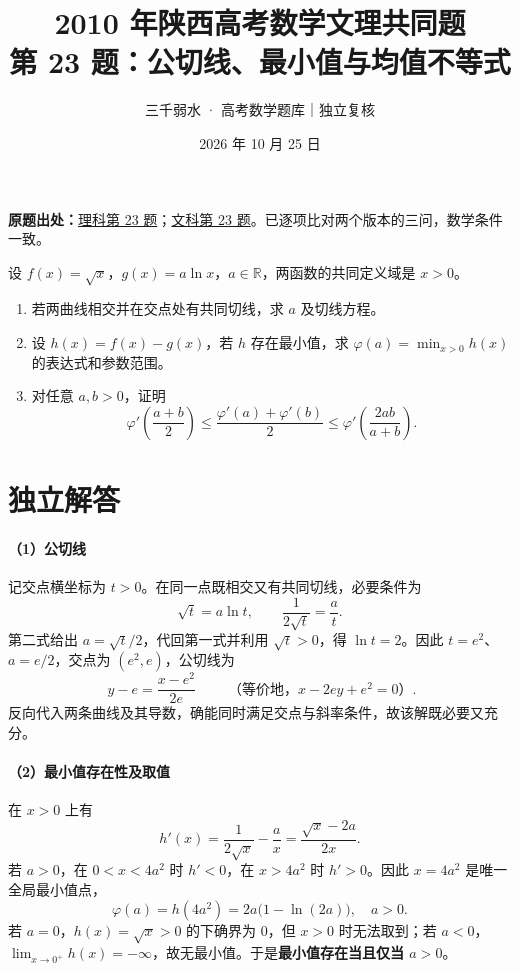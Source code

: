 \documentclass[UTF8,a4paper,10pt]{ctexart}
\title{2010 年陕西高考数学文理共同题\\[2pt]\large 第 23 题：公切线、最小值与均值不等式}
\author{三千弱水 · 高考数学题库｜独立复核}
\date{2026 年 10 月 25 日}
\begin{document}
\maketitle
\noindent\textbf{原题出处：}\href{https://github.com/DxAThing/Gaokao-Math-Problems-Compilation/blob/f1ae169b58a75b3db6e35c670b3f0d5c78718188/content/2010/shaanxi_science.tex\#L500}{理科第 23 题}；\href{https://github.com/DxAThing/Gaokao-Math-Problems-Compilation/blob/f1ae169b58a75b3db6e35c670b3f0d5c78718188/content/2010/shaanxi_liberal.tex\#L509}{文科第 23 题}。已逐项比对两个版本的三问，数学条件一致。

设 $f(x)=\sqrt{x}$，$g(x)=a\ln x$，$a\in\mathbb R$，两函数的共同定义域是 $x>0$。
\begin{enumerate}
\item 若两曲线相交并在交点处有共同切线，求 $a$ 及切线方程。
\item 设 $h(x)=f(x)-g(x)$，若 $h$ 存在最小值，求 $\varphi(a)=\min_{x>0}h(x)$ 的表达式和参数范围。
\item 对任意 $a,b>0$，证明
\[
\varphi'\!\left(\frac{a+b}{2}\right)
\leq\frac{\varphi'(a)+\varphi'(b)}{2}
\leq\varphi'\!\left(\frac{2ab}{a+b}\right).
\]
\end{enumerate}

\section*{独立解答}
\paragraph{（1）公切线}
记交点横坐标为 $t>0$。在同一点既相交又有共同切线，必要条件为
\[
\sqrt t=a\ln t,\qquad \frac{1}{2\sqrt t}=\frac{a}{t}.
\]
第二式给出 $a=\sqrt t/2$，代回第一式并利用 $\sqrt t>0$，得 $\ln t=2$。因此 $t=e^2$、$a=e/2$，交点为 $(e^2,e)$，公切线为
\[
\boxed{\;y-e=\frac{x-e^2}{2e}\;}
\qquad\text{（等价地，$x-2ey+e^2=0$）}.
\]
反向代入两条曲线及其导数，确能同时满足交点与斜率条件，故该解既必要又充分。

\paragraph{（2）最小值存在性及取值}
在 $x>0$ 上有
\[
h'(x)=\frac{1}{2\sqrt x}-\frac a x=\frac{\sqrt x-2a}{2x}.
\]
若 $a>0$，在 $0<x<4a^2$ 时 $h'<0$，在 $x>4a^2$ 时 $h'>0$。因此 $x=4a^2$ 是唯一全局最小值点，
\[
\boxed{\;\varphi(a)=h(4a^2)=2a\bigl(1-\ln(2a)\bigr),\quad a>0.\;}
\]
若 $a=0$，$h(x)=\sqrt x>0$ 的下确界为 $0$，但 $x>0$ 时无法取到；若 $a<0$，$\lim_{x\to0^+}h(x)=-\infty$，故无最小值。于是\textbf{最小值存在当且仅当 $a>0$}。
\end{document}
